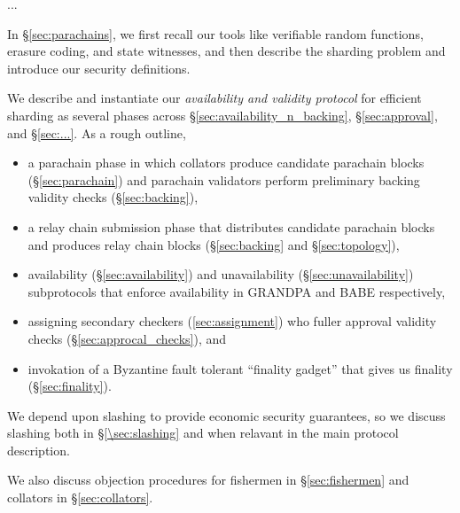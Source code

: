 

...



In \S\ref{sec:parachains}, we first recall our tools like verifiable random functions, erasure coding, and state witnesses, and then describe the sharding problem and introduce our security definitions. 

We describe and instantiate our {\em availability and validity protocol} for efficient sharding as several phases across \S\ref{sec:availability_n_backing}, \S\ref{sec:approval}, and \S\ref{sec:...}.  As a rough outline,
\begin{itemize}
\item a parachain phase in which collators produce candidate parachain blocks (\S\ref{sec:parachain}) and parachain validators perform preliminary backing validity checks (\S\ref{sec:backing}),
\item a relay chain submission phase that distributes candidate parachain blocks and produces relay chain blocks (\S\ref{sec:backing} and \S\ref{sec:topology}),
\item availability (\S\ref{sec:availability}) and unavailability (\S\ref{sec:unavailability}) subprotocols that enforce availability in GRANDPA and BABE respectively,
\item assigning secondary checkers (\ref{sec:assignment}) who fuller approval validity checks (\S\ref{sec:approcal_checks}), and
\item invokation of a Byzantine fault tolerant ``finality gadget'' that gives us finality (\S\ref{sec:finality}).
\end{itemize}
We depend upon slashing to provide economic security guarantees, so we discuss slashing both in \S\ref{\sec:slashing} and when relavant in the main protocol description.

We also discuss objection procedures for fishermen in \S\ref{sec:fishermen} and collators in \S\ref{sec:collators}.

